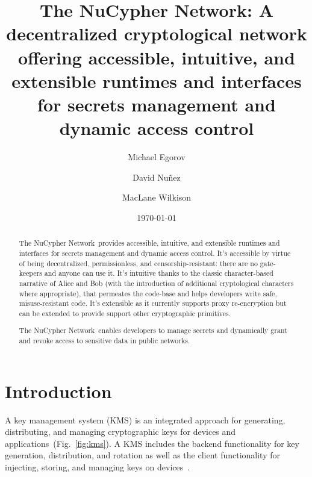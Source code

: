 \documentclass[longbibliography,nofootinbib,twocolumn]{revtex4-1}
\newcommand{\network}{The NuCypher Network}
\newcommand{\figref}[1]{Fig.~\ref{#1}}
\begin{document}
\title{\network: A decentralized cryptological network offering accessible, intuitive, and extensible runtimes and interfaces for secrets management and dynamic access control}

\author{Michael Egorov}
\author{David Nu{\~n}ez}
\author{MacLane Wilkison}

\begin{abstract}
    \network~provides accessible, intuitive, and extensible runtimes and interfaces for secrets management and dynamic access control.
    It's accessible by virtue of being decentralized, permissionless, and censorship-resistant: there are no gate-keepers and anyone can use it.
    It's intuitive thanks to the classic character-based narrative of Alice and Bob (with the introduction of additional cryptological characters
    where appropriate), that permeates the code-base and helps developers write safe, misuse-resistant code.
    It's extensible as it currently supports proxy re-encryption but can be extended to provide support other cryptographic primitives.

    \network~enables developers to manage secrets and dynamically grant and revoke access to sensitive data in public networks.
\end{abstract}

\date{\today}
\maketitle

\tableofcontents

\section{Introduction}

A key management system (KMS) is an integrated approach for generating, distributing, and managing cryptographic keys for devices and
applications~(\figref{fig:kms}).
A KMS includes the backend functionality for key generation, distribution, and rotation as well as the client functionality for
injecting, storing, and managing keys on devices~\cite{wiki:kms}.
\end{document}
